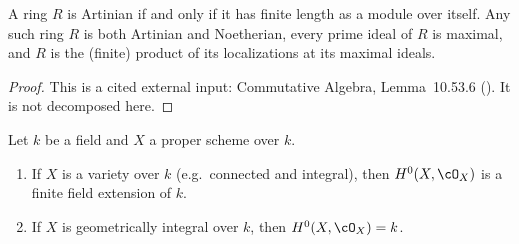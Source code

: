\begin{lemma}
\label{lem:pc-artinian-product-local}
A ring $R$ is Artinian if and only if it has finite length as a module
over itself.  Any such ring $R$ is both Artinian and Noetherian, every
prime ideal of $R$ is maximal, and $R$ is the (finite) product of its
localizations at its maximal ideals.
\end{lemma}
\begin{proof}
This is a cited external input: Commutative Algebra, Lemma~10.53.6
().  It is not decomposed here.
\end{proof}

\begin{lemma}
\label{lem:pc-h0-proper-variety}
Let $k$ be a field and $X$ a proper scheme over $k$.
\begin{enumerate}
\item If $X$ is a variety over $k$ (e.g.\ connected and integral), then
$H^0(X,\cO_X)$ is a finite field extension of $k$.
\item If $X$ is geometrically integral over $k$, then
$H^0(X,\cO_X)=k$.
\end{enumerate}
\end{lemma}
